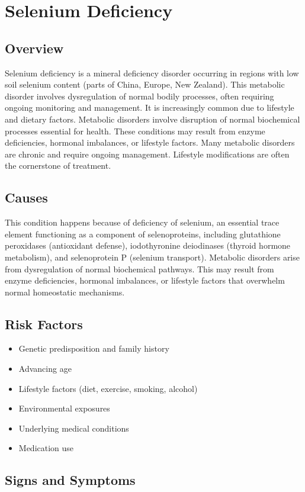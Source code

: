 \chapter{Selenium Deficiency}
\label{sec:Selenium Deficiency}

\section{Overview}
Selenium deficiency is a mineral deficiency disorder occurring in regions with low soil selenium content (parts of China, Europe, New Zealand). This metabolic disorder involves dysregulation of normal bodily processes, often requiring ongoing monitoring and management. It is increasingly common due to lifestyle and dietary factors. Metabolic disorders involve disruption of normal biochemical processes essential for health. These conditions may result from enzyme deficiencies, hormonal imbalances, or lifestyle factors. Many metabolic disorders are chronic and require ongoing management. Lifestyle modifications are often the cornerstone of treatment.
\section{Causes}
This condition happens because of deficiency of selenium, an essential trace element functioning as a component of selenoproteins, including glutathione peroxidases (antioxidant defense), iodothyronine deiodinases (thyroid hormone metabolism), and selenoprotein P (selenium transport). Metabolic disorders arise from dysregulation of normal biochemical pathways. This may result from enzyme deficiencies, hormonal imbalances, or lifestyle factors that overwhelm normal homeostatic mechanisms.   
\section{Risk Factors}
\begin{itemize}[noitemsep]
  \item Genetic predisposition and family history
  \item Advancing age
  \item Lifestyle factors (diet, exercise, smoking, alcohol)
  \item Environmental exposures
  \item Underlying medical conditions
  \item Medication use
\end{itemize}
\section{Signs and Symptoms}
